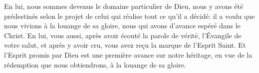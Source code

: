 En lui, nous sommes devenus le domaine particulier de Dieu,
	nous y avons été prédestinés
		selon le projet de celui qui réalise tout ce qu’il a décidé:
	il a voulu que nous vivions à la louange de sa gloire,
	nous qui avons d’avance espéré dans le Christ.
En lui, vous aussi, après avoir écouté la parole de vérité, l’Évangile de votre salut,
	et après y avoir cru,
	vous avez reçu la marque de l’Esprit Saint.
Et l’Esprit promis par Dieu est une première avance sur notre héritage,
	en vue de la rédemption que nous obtiendrons, à la louange de sa gloire.
